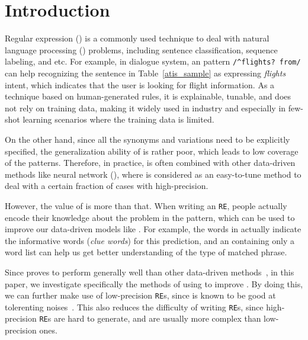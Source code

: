 \section{Introduction}



Regular expression (\RE) is a commonly used technique to deal with natural language processing (\NLP) problems, including sentence classification, sequence labeling, and etc.
For example, in dialogue system, an \RE pattern \texttt{/\textasciicircum flights? from/} can help recognizing the sentence in Table~\ref{atis_sample} as expressing \emph{flights} intent, which indicates that the user is looking for flight information.
As a technique based on human-generated rules, it is explainable, tunable, and does not rely on training data, making it widely used in industry and especially in few-shot learning scenarios where the training data is limited.

On the other hand, since all the synonyms and variations need to be explicitly specified, the generalization ability of \RE is rather poor, which leads to low coverage of the patterns. Therefore, in practice, \RE is often combined with other data-driven methods like neural network (\NN), where \RE is considered as an easy-to-tune method to deal with a certain fraction of cases with high-precision. 

However, the value of \RE is more than that. When writing an \texttt{RE}, people actually encode their knowledge about the problem in the pattern, which can be used to improve our data-driven models like \NN. For example, the words in \RE actually indicate the informative words (\emph{clue words}) for this prediction, and an \RE containing only a word list can help us get better understanding of the type of matched phrase.

Since \NN proves to perform generally well than other data-driven methods~\cite{kim2014convolutional, bahdanau2014neural, yih2015semantic}, in this paper, we investigate specifically the methods of using \RE to improve \NN. 
By doing this, we can further make use of low-precision \texttt{RE}s, since \NN is known to be good at tolerenting noises~\cite{srivastava2014dropout, xie2016disturblabel}. 
This also reduces the difficulty of writing \texttt{RE}s, since high-precision \texttt{RE}s are hard to generate, and are usually more complex than low-precision ones.


